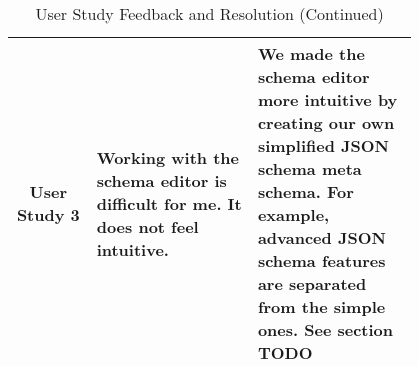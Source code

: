 \begin{table*}
    \centering
    \small %
    \setlength{\extrarowheight}{5pt} %
    \renewcommand{\arraystretch}{1.5} %
    \begin{tabular}{|c|p{0.4\linewidth}|p{0.4\linewidth}|}
        \hline
        User Study 3 & Working with the schema editor is difficult for me. It does not feel intuitive. & 
        We made the schema editor more intuitive by creating our own simplified JSON schema meta schema.
        For example, advanced JSON schema features are separated from the simple ones.
        See section TODO \\
        \cline{2-3}

        \hline
    \end{tabular}
    \caption*{User Study Feedback and Resolution (Continued)} \label{tab:user_study3}

\end{table*}

